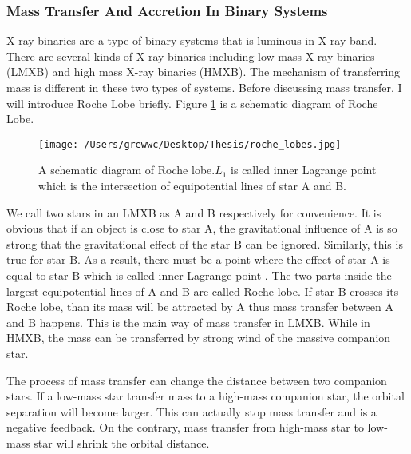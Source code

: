 \documentclass[12pt]{report}
\begin{document}
            \subsubsection{Mass Transfer And Accretion In Binary Systems}
              X-ray binaries are a type of binary systems that is luminous in X-ray band. 
              There are several kinds of X-ray binaries including low mass X-ray binaries 
              (LMXB) and high mass X-ray binaries (HMXB). The mechanism of transferring mass 
              is different in these two types of systems. Before discussing mass 
              transfer, I will introduce Roche Lobe briefly. Figure 
              \ref{fig:roche lobe} is a schematic diagram of Roche Lobe.
              \begin{figure}[h]
                \centering
                \texttt{[image: /Users/grewwc/Desktop/Thesis/roche\_lobes.jpg]}
                \caption{A schematic diagram of Roche lobe.\protect $L_{1}$ is called inner 
                          Lagrange point which is the intersection of equipotential lines 
                          of star A and B.}
                \label{fig:roche lobe}
              \end{figure}
              We call two stars in an LMXB as A and B respectively for convenience. It is 
              obvious that if an object is close to star A, the gravitational influence of A 
              is so strong that the gravitational effect of the star B can be ignored. Similarly, 
              this is true for star B. As a result, there must be a point where the effect 
              of star A is equal to star B which is called inner Lagrange point 
              \cite{0004-637X-603-1-283}. The two parts inside the largest equipotential 
              lines of A and B are called Roche lobe. If star B crosses
              its Roche lobe, than its mass will be attracted by A thus mass transfer between 
              A and B happens. This is the main way of mass transfer in 
              LMXB. While in HMXB, the mass can be transferred by strong wind of the massive 
              companion star. 

              The process of mass transfer can change the distance between two 
              companion stars. If a low-mass star transfer mass to a high-mass companion star,
              the orbital separation will become larger. This can actually stop mass transfer 
              and is a negative feedback. On the contrary, mass transfer from high-mass star 
              to low-mass star will shrink the orbital distance.
                       
\end{document}
